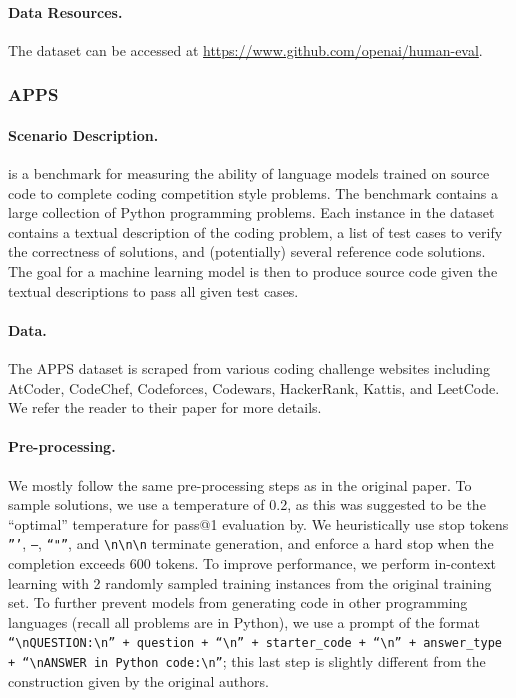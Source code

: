 \paragraph{Data Resources.}
The dataset can be accessed at \url{https://www.github.com/openai/human-eval}.

\subsubsection{APPS}
\paragraph{Scenario Description.}
\codeapps is a benchmark for measuring the ability of language models trained on source code to complete coding competition style problems\citep{Hendrycks2021MeasuringCC}. 
The benchmark contains a large collection of Python programming problems. 
Each instance in the dataset contains a textual description of the coding problem, a list of test cases to verify the correctness of solutions, and (potentially) several reference code solutions. 
The goal for a machine learning model is then to produce source code given the textual descriptions to pass all given test cases.

\paragraph{Data.}
The APPS dataset is scraped from various coding challenge websites including AtCoder, CodeChef, Codeforces, Codewars, HackerRank, Kattis, and LeetCode. We refer the reader to their paper for more details\citep{Hendrycks2021MeasuringCC}.

\paragraph{Pre-processing.}
We mostly follow the same pre-processing steps as in the original paper. 
To sample solutions, we use a temperature of 0.2, as this was suggested to be the ``optimal'' temperature for pass@1 evaluation by\citet{chen2021codex}.
We heuristically use stop tokens \texttt{'''}, \texttt{---}, \texttt{``"''}, and \texttt{\textbackslash n\textbackslash n\textbackslash n} terminate generation, and enforce a hard stop when the completion exceeds 600 tokens. 
To improve performance, we perform in-context learning with 2 randomly sampled training instances from the original training set.
To further prevent models from generating code in other programming languages (recall all problems are in Python), we use a prompt of the format \texttt{``\textbackslash nQUESTION:\textbackslash n'' + question + ``\textbackslash n'' + starter\_code + ``\textbackslash n'' + answer\_type + ``\textbackslash nANSWER in Python code:\textbackslash n''}; this last step is slightly different from the construction given by the original authors. 

